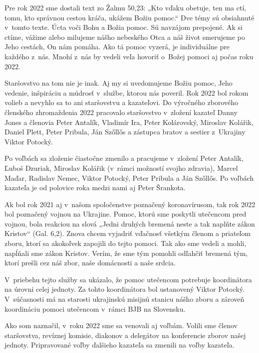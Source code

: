 \vfill\break



Pre rok 2022 sme dostali text zo Žalmu 50,23: „Kto vďaku obetuje, ten ma ctí, tomu, kto správnou cestou kráča, ukážem Božiu pomoc.“ Dve témy sú obsiahnuté v~tomto texte. Úcta voči Bohu a Božia pomoc. Sú navzájom prepojené. Ak si ctíme, vážime alebo milujeme nášho nebeského Otca a náš život smerujeme po Jeho cestách, On nám pomáha. Ako tá pomoc vyzerá, je individuálne pre každého z~nás. Mnohí z~nás by vedeli veľa hovoriť o~Božej pomoci aj počas roku 2022.

Staršovstvo na tom nie je inak. Aj my si uvedomujeme Božiu pomoc, Jeho vedenie, inšpiráciu a múdrosť v~službe, ktorou nás poveril.
Rok 2022 bol rokom volieb a nevyhlo sa to ani staršovstvu a kazateľovi.
Do výročného zborového členského zhromaždenia 2022 pracovalo staršovstvo v~zložení kazateľ Danny Jones a členovia Peter Antalík, Vladimír Ira, Peter Kolárovský, Miroslav Kolářik, Daniel Plett, Peter Pribula, Ján Szőllős a zástupca bratov a sestier z~Ukrajiny Viktor Potocký.

Po voľbách sa zloženie čiastočne zmenilo a pracujeme v~zložení Peter Antalík, Ľuboš Dzuriak, Miroslav Kolářik (v~rámci možností svojho zdravia), Marcel Maďar, Radislav Nemec, Viktor Potocký, Peter Pribula a Ján Szőllős. Po voľbách kazateľa je od polovice roka medzi nami aj Peter Šrankota.

Ak bol rok 2021 aj v~našom spoločenstve poznačený koronavírusom, tak rok 2022 bol poznačený vojnou na Ukrajine. Pomoc, ktorú sme poskytli utečencom pred vojnou, bola reakciou na slová „Jedni druhých bremená neste a tak naplňte zákon Kristov“ (Gal. 6,2). Znova chcem vyjadriť vďačnosť všetkým členom a priateľom zboru, ktorí sa akokoľvek zapojili do tejto pomoci. Tak ako sme vedeli a mohli, napĺňali sme zákon Kristov. Verím, že sme tým pomohli odľahčiť bremená tým, ktorí prešli cez náš zbor, naše domácnosti a naše srdcia.

V~priebehu tejto služby sa ukázalo, že pomoc utečencom potrebuje koordinátora na úrovni celej jednoty. Za tohto koordinátora bol ustanovený Viktor Potocký. V~súčasnosti má na starosti ukrajinskú misijnú stanicu nášho zboru a zároveň koordináciu pomoci utečencom v~rámci BJB na Slovensku.

Ako som naznačil, v~roku 2022 sme sa venovali aj voľbám. Volili sme členov staršovstva, revíznej komisie, diakonov a delegátov na konferencie zborov našej jednoty. Pripravované voľby ďalšieho kazateľa sa zmenili na voľby kazateľa.

